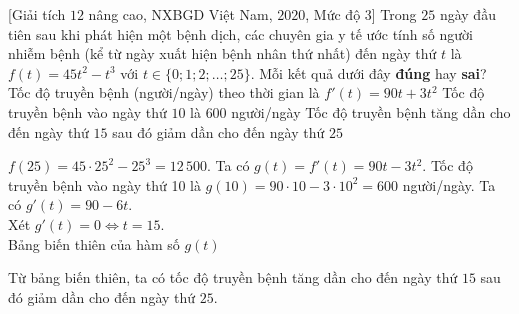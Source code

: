\begin{ex}%
[Giải tích $12$ nâng cao, NXBGD Việt Nam, $2020$, Mức độ 3]%
%
	Trong $25$ ngày đầu tiên sau khi phát hiện một bệnh dịch, các chuyên gia y tế ước tính số người nhiễm bệnh (kể từ ngày xuất hiện bệnh nhân thứ nhất) đến ngày thứ $t$ là $f(t)=45t^2-t^3$ với $t\in\{0;1;2;\ldots;25\}$.
	Mỗi kết quả dưới đây \textbf{đúng} hay \textbf{sai}?
	{Tốc độ truyền bệnh (người/ngày) theo thời gian là $f'(t)=90t+3t^2$}
	{\True Tốc độ truyền bệnh vào ngày thứ $10$ là $600$ người/ngày}
	{\True Tốc độ truyền bệnh tăng dần cho đến ngày thứ $15$ sau đó giảm dần cho đến ngày thứ $25$}
	\loigiai
	{
		\begin{itemchoice}
			\itemch $f(25)=45\cdot 25^2-25^3=12\,500$.
			\itemch Ta có $g(t)=f'(t)=90t-3t^2$. 
			\itemch Tốc độ truyền bệnh vào ngày thứ 10 là $g(10)=90\cdot 10-3\cdot 10^2=600$ người/ngày.
			\itemch Ta có $g'(t)=90-6t$. \\
			Xét $g'(t)=0 \Leftrightarrow t=15$. \\
			Bảng biến thiên của hàm số $g(t)$
			\begin{center}
			\end{center}
			Từ bảng biến thiên, ta có tốc độ truyền bệnh tăng dần cho đến ngày thứ $15$ sau đó giảm dần cho đến ngày thứ $25$.
		\end{itemchoice}
	}
\end{ex}

